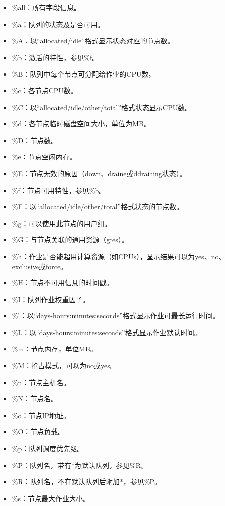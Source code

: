 \begin{itemize}
\begin{itemize}
   	\item \%all：所有字段信息。
   	\item \%a：队列的状态及是否可用。
   	\item \%A：以``allocated/idle''格式显示状态对应的节点数。
   	\item \%b：激活的特性，参见\%f。
   	\item \%B：队列中每个节点可分配给作业的CPU数。
   	\item \%c：各节点CPU数。
   	\item \%C：以``allocated/idle/other/total''格式状态显示CPU数。
   	\item \%d：各节点临时磁盘空间大小，单位为MB。
   	\item \%D：节点数。
   	\item \%e：节点空闲内存。
   	\item \%E：节点无效的原因（down、draine或ddraining状态）。
   	\item \%f：节点可用特性，参见\%b。
   	\item \%F：以``allocated/idle/other/total''格式状态的节点数。
   	\item \%g：可以使用此节点的用户组。
   	\item \%G：与节点关联的通用资源（gres）。
   	\item \%h：作业是否能超用计算资源（如CPUs），显示结果可以为yes、no、exclusive或force。
   	\item \%H：节点不可用信息的时间戳。
   	\item \%I：队列作业权重因子。
   	\item \%l：以``days-hours:minutes:seconds''格式显示作业可最长运行时间。
   	\item \%L：以``days-hours:minutes:seconds''格式显示作业默认时间。
   	\item \%m：节点内存，单位MB。
   	\item \%M：抢占模式，可以为no或yes。
   	\item \%n：节点主机名。
   	\item \%N：节点名。
   	\item \%o：节点IP地址。
   	\item \%O：节点负载。
   	\item \%p：队列调度优先级。
   	\item \%P：队列名，带有*为默认队列，参见\%R。
   	\item \%R：队列名，不在默认队列后附加*，参见\%P。
   	\item \%s：节点最大作业大小。

\end{itemize}
\end{itemize}
